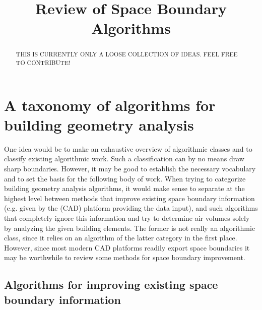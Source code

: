 \documentclass{scrartcl}
\title{Review of Space Boundary Algorithms}
\begin{document}
\maketitle

\begin{abstract}
THIS IS CURRENTLY ONLY A LOOSE COLLECTION OF IDEAS. FEEL FREE TO CONTRIBUTE!
\end{abstract}

\section{A taxonomy of algorithms for building geometry analysis}

One idea would be to make an exhaustive overview of algorithmic classes and to classify existing algorithmic work. Such a classification can by no means draw sharp boundaries. However, it may be good to establish the necessary vocabulary and to set the basis for the following body of work. When trying to categorize building geometry analysis algorithms, it would make sense to separate at the highest level between methods that improve existing space boundary information (e.g. given by the (CAD) platform providing the data input), and such algorithms that completely ignore this information and try to determine air volumes solely by analyzing the given building elements. The former is not really an algorithmic class, since it relies on an algorithm of the latter category in the first place. However, since most modern CAD platforms readily export space boundaries it may be worthwhile to review some methods for space boundary improvement.

\subsection{Algorithms for improving existing space boundary information}
\end{document}
